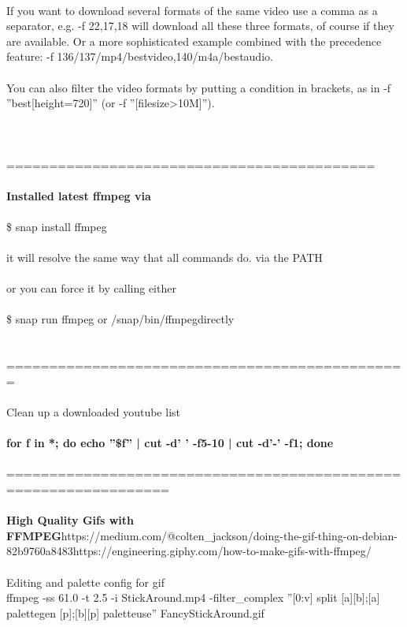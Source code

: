 \documentclass[10pt,a4paper]{article}
\begin{document}
{{{{{{{{{{{{{{{{\\
If you want to download several formats of the same video use a comma as a separator, e.g.  -f 22,17,18 will download  all these three formats, of course if they are available.  Or a more sophisticated example combined with the precedence feature: -f 136/137/mp4/bestvideo,140/m4a/bestaudio.\\
\\
You can also filter the video formats by  putting  a  condition  in  brackets,  as  in  -f ''best[height=720]''  (or -f ''[filesize>10M]'').\\
\\
\\
\\
===========================================\\
\\
\textbf{Installed latest ffmpeg via  }}{\large \\
\\
\$ snap install ffmpeg\\
\\
it will resolve the same way that all commands do. via the PATH\\
\\
or you can force it by calling either \\
\\
\$ snap run ffmpeg 		or		 /snap/bin/ffmpeg}{\large  		directly\\
\\
\\
===============================================\\
\\
}{\Large Clean up a downloaded youtube list\\
\\
\textbf{for f in *; do echo ''\$f'' | cut -d' ' -f5-10 | cut -d'-' -f1; done}}{\large \\
\\
=================================================================\\
\\
}\textbf{{\Large High Quality Gifs with FFMPEG}}{\large https://medium.com/@colten\_jackson/doing-the-gif-thing-on-debian-82b9760a8483}{\large https://engineering.giphy.com/how-to-make-gifs-with-ffmpeg/}{\large \\
\\
Editing and palette config for gif\\
ffmpeg -ss 61.0 -t 2.5 -i StickAround.mp4 -filter\_complex ''[0:v] split [a][b];[a] palettegen [p];[b][p] paletteuse'' FancyStickAround.gif\\
}}}}}}}}}}}}}}}}
\end{document}
